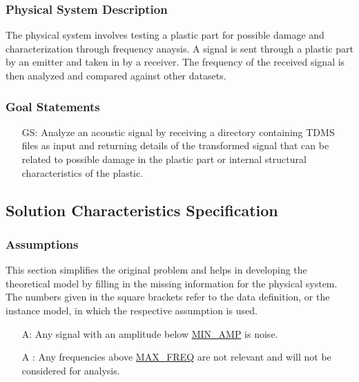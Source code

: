\documentclass[12pt]{article}
\newcounter{assumpnum} %
\newcounter{goalnum} %
\begin{document}
\subsubsection{Physical System Description}

The physical system involves testing a plastic part for possible damage and 
characterization through frequency anaysis. A signal is sent through a plastic part 
by an emitter and taken in by a receiver. The frequency of the received signal is 
then analyzed and compared against other datasets.

\subsubsection{Goal Statements}

\begin{itemize}
\item[GS\refstepcounter{goalnum}\thegoalnum:] Analyze an acoustic signal by 
receiving a directory containing TDMS files as input and returning
details of the transformed signal that can be related to possible damage in the
 plastic part or internal structural characteristics of the plastic.
\end{itemize}

\subsection{Solution Characteristics Specification}

\subsubsection{Assumptions} \label{Assumptions}

This section simplifies the original problem and helps in developing the
theoretical model by filling in the missing information for the physical
system. The numbers given in the square brackets refer to the data definition,
or the instance model, in which the respective assumption is used.

\begin{itemize}

\item[A\refstepcounter{assumpnum}\theassumpnum \label{A_MinVolt}:] Any signal
  with an amplitude below \hyperref[AppendA]{MIN\_AMP} is noise. 
\item[A\refstepcounter{assumpnum}\theassumpnum
\label{A_MaxFreq}:]Any frequencies above \hyperref[AppendA]{MAX\_FREQ} are not
relevant and will not be considered for analysis.

\end{itemize}
\end{document}
